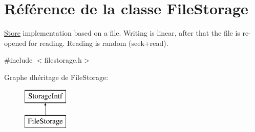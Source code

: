 \hypertarget{class_file_storage}{}\section{Référence de la classe File\+Storage}
\label{class_file_storage}


\hyperlink{class_store}{Store} implementation based on a file. Writing is linear, after that the file is re-\/opened for reading. Reading is random (seek+read).  




{\ttfamily \#include $<$filestorage.\+h$>$}

Graphe d\textquotesingle{}héritage de File\+Storage\+:\begin{figure}[H]
\begin{center}
\leavevmode
\includegraphics[height=2.000000cm]{class_file_storage}
\end{center}
\end{figure}
